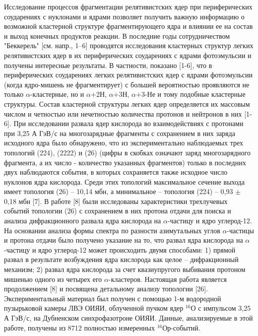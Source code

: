 \documentclass[fontsize=14pt]{scrreport}
\begin{document}
Исследование процессов фрагментации релятивистских ядер при периферических соударениях с нуклонами и ядрами позволяет получить важную информацию о возможной кластерной структуре фрагментирующего ядра и влиянии ее на состав и выход конечных продуктов реакции. В последние годы сотрудничеством "Беккерель" [см. напр., 1–6] проводятся исследования кластерных структур легких релятивистских ядер в их периферических соударениях с ядрами фотоэмульсии и получены интересные результаты. В частности, показано [1-6], что в периферических соударениях легких релятивистских ядер с ядрами фотоэмульсии (когда ядро-мишень не фрагментирует) с большей вероятностью проявляются не только $\alpha$-кластерные, но и $\alpha$+2Н, $\alpha$+3Н, $\alpha$+3-Не и тому подобные кластерные структуры. Состав кластерной структуры легких ядер определяется их массовым числом и четностью или нечетностью количества протонов и нейтронов в них [1-6]. При исследовании развала ядер кислорода во взаимодействиях с протонами при 3,25 А ГэВ/с на многозарядные фрагменты с сохранением в них заряда исходного ядра было обнаружено, что из экспериментально наблюдаемых трех топологий (224), (2222) и (26) (цифры в скобках означают заряд многозарядного фрагмента, а их число - количество указанных фрагментов) только в последних
двух наблюдаются события, в которых сохраняется также исходное число нуклонов ядра кислорода. Среди этих топологий максимальное сечение выхода имеет топология (26) – 10,14 мбн, а минимальное – топология (224) – 0,93 $\pm$ 0,18 мбн [7]. В работе [8] были исследованы характеристики трехлучевых событий топологии (26) с сохранением в них протона отдачи для поиска и анализа дифракционного развала ядра кислорода на $\alpha$-частицу и ядро углерод-12. На основании анализа формы спектра по разности азимутальных углов $\alpha$-частицы и протона отдачи было получено указание на то, что развал ядра кислорода на $\alpha$-частицу и ядро углерод-12 может происходить двумя способами: 1) прямой развал в результате возбуждения ядра кислорода как целое – дифракционный механизм; 2) развал ядра кислорода за счет квазиупругого выбивания протоном мишенью одного из четырех его $\alpha$-кластеров. Настоящая работа является продолжением [8] и посвящена детальному анализу топологии [26]. Экспериментальный материал был получен с помощью 1-м водородной пузырьковой камеры ЛВЭ ОИЯИ, облученной пучком ядер $^{16}$О с импульсом 3,25 А ГэВ/с, на Дубненском  синхрофазотроне ОИЯИ. Данные, анализируемые в этой работе, получены из 8712 полностью измеренных $^{16}$Ор-событий.
\end{document}
